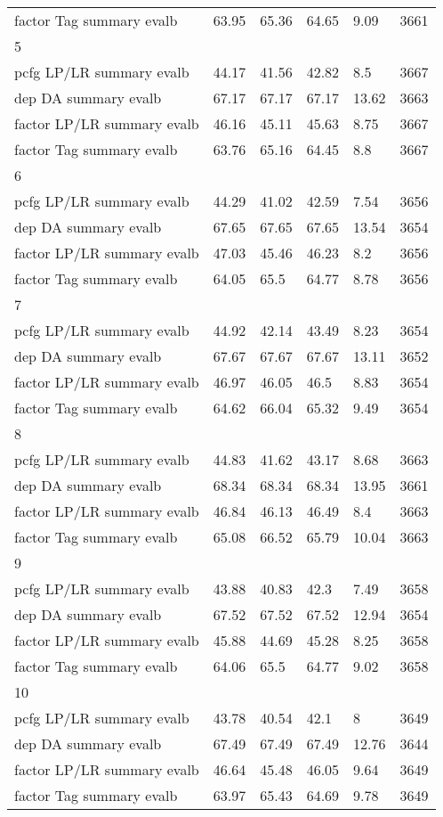 \begin{longtable}{|p{}|p{}|p{}|p{}|p{}|p{}|}
    factor Tag summary evalb & 63.95 & 65.36 & 64.65 & 9.09 & 3661\\
    5 &  &  &  &  & \\
    pcfg LP/LR summary evalb & 44.17 & 41.56 & 42.82 & 8.5 & 3667\\
    dep DA summary evalb & 67.17 & 67.17 & 67.17 & 13.62 & 3663\\
    factor LP/LR summary evalb & 46.16 & 45.11 & 45.63 & 8.75 & 3667\\
    factor Tag summary evalb & 63.76 & 65.16 & 64.45 & 8.8 & 3667\\
    6 &  &  &  &  & \\
    pcfg LP/LR summary evalb & 44.29 & 41.02 & 42.59 & 7.54 & 3656\\
    dep DA summary evalb & 67.65 & 67.65 & 67.65 & 13.54 & 3654\\
    factor LP/LR summary evalb & 47.03 & 45.46 & 46.23 & 8.2 & 3656\\
    factor Tag summary evalb & 64.05 & 65.5 & 64.77 & 8.78 & 3656\\
    7 &  &  &  &  & \\
    pcfg LP/LR summary evalb & 44.92 & 42.14 & 43.49 & 8.23 & 3654\\
    dep DA summary evalb & 67.67 & 67.67 & 67.67 & 13.11 & 3652\\
    factor LP/LR summary evalb & 46.97 & 46.05 & 46.5 & 8.83 & 3654\\
    factor Tag summary evalb & 64.62 & 66.04 & 65.32 & 9.49 & 3654\\
    8 &  &  &  &  & \\
    pcfg LP/LR summary evalb & 44.83 & 41.62 & 43.17 & 8.68 & 3663\\
    dep DA summary evalb & 68.34 & 68.34 & 68.34 & 13.95 & 3661\\
    factor LP/LR summary evalb & 46.84 & 46.13 & 46.49 & 8.4 & 3663\\
    factor Tag summary evalb & 65.08 & 66.52 & 65.79 & 10.04 & 3663\\
    9 &  &  &  &  & \\
    pcfg LP/LR summary evalb & 43.88 & 40.83 & 42.3 & 7.49 & 3658\\
    dep DA summary evalb & 67.52 & 67.52 & 67.52 & 12.94 & 3654\\
    factor LP/LR summary evalb & 45.88 & 44.69 & 45.28 & 8.25 & 3658\\
    factor Tag summary evalb & 64.06 & 65.5 & 64.77 & 9.02 & 3658\\
    10 &  &  &  &  & \\
    pcfg LP/LR summary evalb & 43.78 & 40.54 & 42.1 & 8 & 3649\\
    dep DA summary evalb & 67.49 & 67.49 & 67.49 & 12.76 & 3644\\
    factor LP/LR summary evalb & 46.64 & 45.48 & 46.05 & 9.64 & 3649\\
    factor Tag summary evalb & 63.97 & 65.43 & 64.69 & 9.78 & 3649
    \label{tab:bosque_result_full}
\end{longtable}